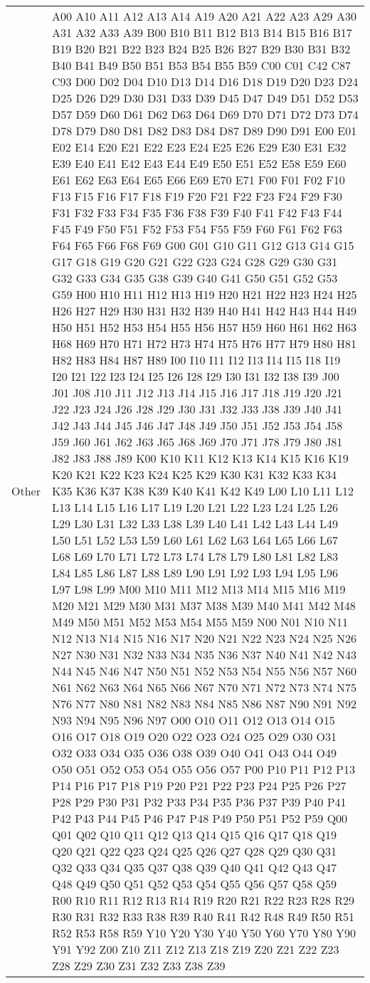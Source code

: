 \begin{table}
\begin{threeparttable}
\begin{tabular}{lp{13cm}}
            Other&A00 A10 A11 A12 A13 A14 A19 A20 A21 A22 A23 A29 A30 A31 A32 A33 A39 B00 B10 B11 B12 B13 B14 B15 B16 B17 B19 B20 B21 B22 B23 B24 B25 B26 B27 B29 B30 B31 B32 B40 B41 B49 B50 B51 B53 B54 B55 B59 C00 C01 C42 C87 C93 D00 D02 D04 D10 D13 D14 D16 D18 D19 D20 D23 D24 D25 D26 D29 D30 D31 D33 D39 D45 D47 D49 D51 D52 D53 D57 D59 D60 D61 D62 D63 D64 D69 D70 D71 D72 D73 D74 D78 D79 D80 D81 D82 D83 D84 D87 D89 D90 D91 E00 E01 E02 E14 E20 E21 E22 E23 E24 E25 E26 E29 E30 E31 E32 E39 E40 E41 E42 E43 E44 E49 E50 E51 E52 E58 E59 E60 E61 E62 E63 E64 E65 E66 E69 E70 E71 F00 F01 F02 F10 F13 F15 F16 F17 F18 F19 F20 F21 F22 F23 F24 F29 F30 F31 F32 F33 F34 F35 F36 F38 F39 F40 F41 F42 F43 F44 F45 F49 F50 F51 F52 F53 F54 F55 F59 F60 F61 F62 F63 F64 F65 F66 F68 F69 G00 G01 G10 G11 G12 G13 G14 G15 G17 G18 G19 G20 G21 G22 G23 G24 G28 G29 G30 G31 G32 G33 G34 G35 G38 G39 G40 G41 G50 G51 G52 G53 G59 H00 H10 H11 H12 H13 H19 H20 H21 H22 H23 H24 H25 H26 H27 H29 H30 H31 H32 H39 H40 H41 H42 H43 H44 H49 H50 H51 H52 H53 H54 H55 H56 H57 H59 H60 H61 H62 H63 H68 H69 H70 H71 H72 H73 H74 H75 H76 H77 H79 H80 H81 H82 H83 H84 H87 H89 I00 I10 I11 I12 I13 I14 I15 I18 I19 I20 I21 I22 I23 I24 I25 I26 I28 I29 I30 I31 I32 I38 I39 J00 J01 J08 J10 J11 J12 J13 J14 J15 J16 J17 J18 J19 J20 J21 J22 J23 J24 J26 J28 J29 J30 J31 J32 J33 J38 J39 J40 J41 J42 J43 J44 J45 J46 J47 J48 J49 J50 J51 J52 J53 J54 J58 J59 J60 J61 J62 J63 J65 J68 J69 J70 J71 J78 J79 J80 J81 J82 J83 J88 J89 K00 K10 K11 K12 K13 K14 K15 K16 K19 K20 K21 K22 K23 K24 K25 K29 K30 K31 K32 K33 K34 K35 K36 K37 K38 K39 K40 K41 K42 K49 L00 L10 L11 L12 L13 L14 L15 L16 L17 L19 L20 L21 L22 L23 L24 L25 L26 L29 L30 L31 L32 L33 L38 L39 L40 L41 L42 L43 L44 L49 L50 L51 L52 L53 L59 L60 L61 L62 L63 L64 L65 L66 L67 L68 L69 L70 L71 L72 L73 L74 L78 L79 L80 L81 L82 L83 L84 L85 L86 L87 L88 L89 L90 L91 L92 L93 L94 L95 L96 L97 L98 L99 M00 M10 M11 M12 M13 M14 M15 M16 M19 M20 M21 M29 M30 M31 M37 M38 M39 M40 M41 M42 M48 M49 M50 M51 M52 M53 M54 M55 M59 N00 N01 N10 N11 N12 N13 N14 N15 N16 N17 N20 N21 N22 N23 N24 N25 N26 N27 N30 N31 N32 N33 N34 N35 N36 N37 N40 N41 N42 N43 N44 N45 N46 N47 N50 N51 N52 N53 N54 N55 N56 N57 N60 N61 N62 N63 N64 N65 N66 N67 N70 N71 N72 N73 N74 N75 N76 N77 N80 N81 N82 N83 N84 N85 N86 N87 N90 N91 N92 N93 N94 N95 N96 N97 O00 O10 O11 O12 O13 O14 O15 O16 O17 O18 O19 O20 O22 O23 O24 O25 O29 O30 O31 O32 O33 O34 O35 O36 O38 O39 O40 O41 O43 O44 O49 O50 O51 O52 O53 O54 O55 O56 O57 P00 P10 P11 P12 P13 P14 P16 P17 P18 P19 P20 P21 P22 P23 P24 P25 P26 P27 P28 P29 P30 P31 P32 P33 P34 P35 P36 P37 P39 P40 P41 P42 P43 P44 P45 P46 P47 P48 P49 P50 P51 P52 P59 Q00 Q01 Q02 Q10 Q11 Q12 Q13 Q14 Q15 Q16 Q17 Q18 Q19 Q20 Q21 Q22 Q23 Q24 Q25 Q26 Q27 Q28 Q29 Q30 Q31 Q32 Q33 Q34 Q35 Q37 Q38 Q39 Q40 Q41 Q42 Q43 Q47 Q48 Q49 Q50 Q51 Q52 Q53 Q54 Q55 Q56 Q57 Q58 Q59 R00 R10 R11 R12 R13 R14 R19 R20 R21 R22 R23 R28 R29 R30 R31 R32 R33 R38 R39 R40 R41 R42 R48 R49 R50 R51 R52 R53 R58 R59 Y10 Y20 Y30 Y40 Y50 Y60 Y70 Y80 Y90 Y91 Y92 Z00 Z10 Z11 Z12 Z13 Z18 Z19 Z20 Z21 Z22 Z23 Z28 Z29 Z30 Z31 Z32 Z33 Z38 Z39\\

\end{tabular}
\end{threeparttable}
\end{table}

